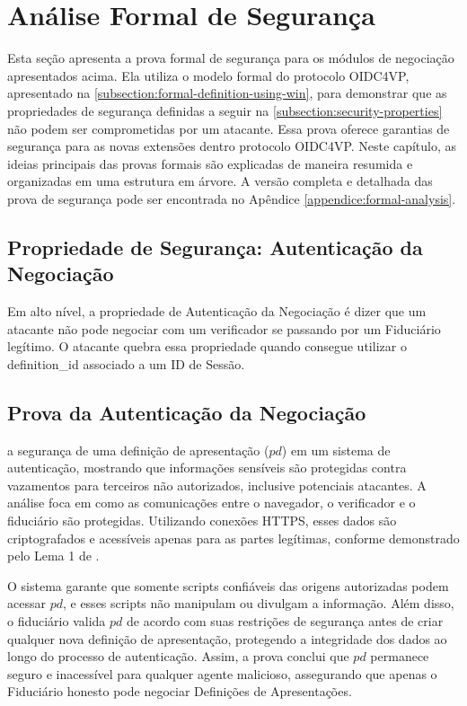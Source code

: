 


\section{Análise Formal de Segurança}\label{section:formal-security-analysis}

Esta seção apresenta a prova formal de segurança para os módulos de negociação apresentados acima. Ela utiliza o modelo formal do protocolo \acs{OIDC4VP}, apresentado na \autoref{subsection:formal-definition-using-win}, para demonstrar que as propriedades de segurança definidas a seguir na \autoref{subsection:security-properties} não podem ser comprometidas por um atacante. Essa prova oferece garantias de segurança para as novas extensões dentro protocolo \acs{OIDC4VP}. Neste capítulo, as ideias principais das provas formais são explicadas de maneira resumida e organizadas em uma estrutura em árvore. A versão completa e detalhada das prova de segurança pode ser encontrada no Apêndice \ref{appendice:formal-analysis}.


\subsection{Propriedade de Segurança: Autenticação da Negociação}\label{subsection:security-properties}

Em alto nível, a propriedade de Autenticação da Negociação é dizer que um atacante não pode negociar com um verificador se passando por um Fiduciário legítimo. O atacante quebra essa propriedade quando consegue utilizar o definition\_id associado a um ID de Sessão. 

\subsection{Prova da Autenticação da Negociação}

a segurança de uma definição de apresentação ($pd$) em um sistema de autenticação, mostrando que informações sensíveis são protegidas contra vazamentos para terceiros não autorizados, inclusive potenciais atacantes. A análise foca em como as comunicações entre o navegador, o verificador e o fiduciário são protegidas. Utilizando conexões HTTPS, esses dados são criptografados e acessíveis apenas para as partes legítimas, conforme demonstrado pelo Lema 1 de .

O sistema garante que somente scripts confiáveis das origens autorizadas podem acessar $pd$, e esses scripts não manipulam ou divulgam a informação. Além disso, o fiduciário valida $pd$ de acordo com suas restrições de segurança antes de criar qualquer nova definição de apresentação, protegendo a integridade dos dados ao longo do processo de autenticação. Assim, a prova conclui que $pd$ permanece seguro e inacessível para qualquer agente malicioso, assegurando que apenas o Fiduciário honesto pode negociar Definições de Apresentações.

